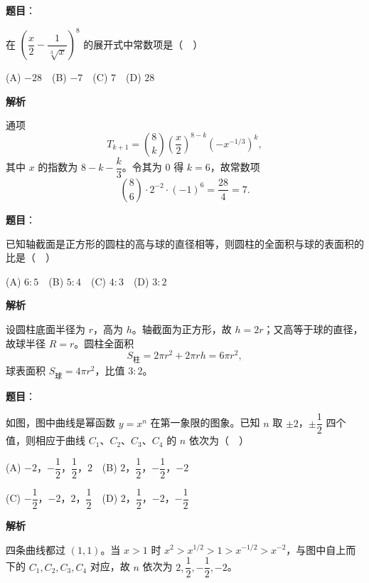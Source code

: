 \begin{answer}

\textbf{题目}：

在 \(\left(\dfrac{x}{2}-\dfrac{1}{\sqrt[3]{x}}\right)^8\) 的展开式中常数项是（　）

(A) \(-28\)　(B) \(-7\)　(C) \(7\)　(D) \(28\)

\textbf{解析}

通项
\nopagebreak[4]
\[
T_{k+1}=\binom8k\left(\frac x2\right)^{8-k}\left(-x^{-1/3}\right)^k,
\]
其中 \(x\) 的指数为 \(8-k-\dfrac k3\)。令其为 0 得 \(k=6\)，故常数项
\nopagebreak[4]
\[
\binom86\cdot2^{-2}\cdot(-1)^6=\frac{28}{4}=7.
\]


\end{answer}
\begin{answer}

\textbf{题目}：

已知轴截面是正方形的圆柱的高与球的直径相等，则圆柱的全面积与球的表面积的比是（　）

(A) \(6:5\)　(B) \(5:4\)　(C) \(4:3\)　(D) \(3:2\)

\textbf{解析}

设圆柱底面半径为 \(r\)，高为 \(h\)。轴截面为正方形，故 \(h=2r\)；又高等于球的直径，故球半径 \(R=r\)。圆柱全面积
\nopagebreak[4]
\[
S_{\text{柱}}=2\pi r^2+2\pi rh=6\pi r^2,
\]
球表面积 \(S_{\text{球}}=4\pi r^2\)，比值 \(3:2\)。


\end{answer}
\begin{answer}

\textbf{题目}：

如图，图中曲线是幂函数 \(y=x^n\) 在第一象限的图象。已知 \(n\) 取 \(\pm 2\)，\(\pm\dfrac{1}{2}\) 四个值，则相应于曲线 \(C_1\)、\(C_2\)、\(C_3\)、\(C_4\) 的 \(n\) 依次为（　）
\nopagebreak[4]
\begin{center}\end{center}
\nopagebreak[4]
(A) \(-2\)，\(-\dfrac{1}{2}\)，\(\dfrac{1}{2}\)，\(2\)　(B) \(2\)，\(\dfrac{1}{2}\)，\(-\dfrac{1}{2}\)，\(-2\)

(C) \(-\dfrac{1}{2}\)，\(-2\)，\(2\)，\(\dfrac{1}{2}\)　(D) \(2\)，\(\dfrac{1}{2}\)，\(-2\)，\(-\dfrac{1}{2}\)

\textbf{解析}

四条曲线都过 \((1,1)\)。当 \(x>1\) 时 \(x^2>x^{1/2}>1>x^{-1/2}>x^{-2}\)，与图中自上而下的 \(C_1,C_2,C_3,C_4\) 对应，故 \(n\) 依次为 \(2,\dfrac12,-\dfrac12,-2\)。


\end{answer}
